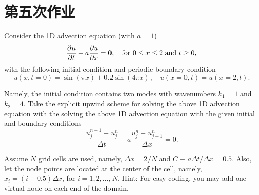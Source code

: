 \section{第五次作业}

\begin{homework}[label={H:5-1}]
    Consider the 1D advection equation (with $a=1$)
    \begin{equation}\label{E:5-1-1}
        \pdv{u}{t} + a\pdv{u}{x} = 0,
        \quad
        \text{for $0\leq x\leq 2$ and $t\geq 0$},
    \end{equation}
    with the following initial condition and periodic boundary condition
    \begin{equation}\label{E:5-1-2}
        u(x, t=0) = \sin(\pi x) + 0.2\sin(4\pi x),
        \quad
        u(x=0, t) = u(x=2, t).
    \end{equation}

    Namely, the initial condition contains two modes with wavenumbers $k_1=1$ and $k_2=4$. Take the explicit upwind scheme for solving the above 1D advection equation with the solving the above 1D advection equation with the given initial and boundary conditions
    \begin{equation}\label{E:5-1-3}
        \frac{u^{n+1}_j-u^n_j}{\Delta t} + a\frac{u^n_j-u^n_{j-1}}{\Delta x} = 0.
    \end{equation}

    Assume $N$ grid cells are used, namely, $\Delta x=2/N$ and $C\equiv a\Delta t/\Delta x=0.5$. Also, let the node points are located at the center of the cell, namely, $x_i=(i-0.5)\Delta x$, for $i=1,2,\ldots,N$. Hint: For easy coding, you may add one virtual node on each end of the domain.


\end{homework}
